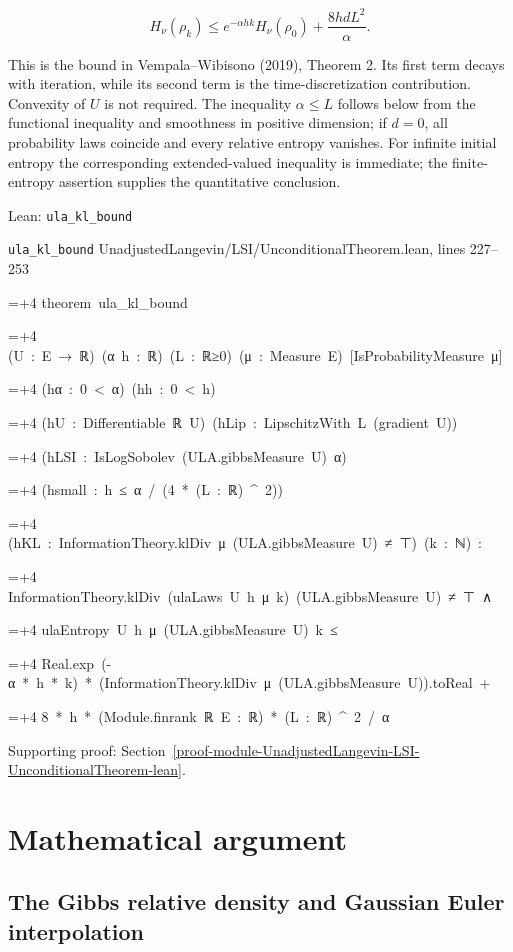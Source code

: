 \documentclass[11pt,a4paper]{report}
\newlength{\leancharwidth}
\newenvironment{leancode}{\par\smallskip\begingroup\ttfamily\footnotesize\raggedright
  \settowidth{\leancharwidth}{M}\setlength{\parskip}{0pt}\setlength{\parindent}{0pt}
  \frenchspacing}{\par\endgroup\smallskip}
\newcommand{\leanline}[2]{\hangindent=\dimexpr#1\leancharwidth+4\leancharwidth\relax
  \hangafter=1\noindent\hspace*{#1\leancharwidth}#2\par}
\newcommand{\leansource}[1]{\par{\footnotesize\color{leanmuted}#1}\par}
\begin{document}
\[\boxed{H_\nu(\rho_k)\le e^{-\alpha hk}H_\nu(\rho_0)+\frac{8hdL^2}{\alpha}.}\]

This is the bound in Vempala–Wibisono (2019), Theorem 2. Its first term decays with iteration, while its second term is the time-discretization contribution. Convexity of \(U\) is not required. The inequality \(\alpha\le L\) follows below from the functional inequality and smoothness in positive dimension; if \(d=0\), all probability laws coincide and every relative entropy vanishes. For infinite initial entropy the corresponding extended-valued inequality is immediate; the finite-entropy assertion supplies the quantitative conclusion.

\begin{leanbox}{Lean: \texttt{ula\_\allowbreak{}kl\_\allowbreak{}bound}}
\leansource{\texttt{ula\_\allowbreak{}kl\_\allowbreak{}bound} \quad UnadjustedLangevin/\allowbreak{}LSI/\allowbreak{}UnconditionalTheorem.lean, lines 227–253}
\begin{leancode}
\leanline{0}{theorem\ ula\_kl\_bound}
\leanline{4}{(U\ :\ E\ →\ ℝ)\ (α\ h\ :\ ℝ)\ (L\ :\ ℝ≥0)\ (μ\ :\ Measure\ E)\ [IsProbabilityMeasure\ μ]}
\leanline{4}{(hα\ :\ 0\ <\ α)\ (hh\ :\ 0\ <\ h)}
\leanline{4}{(hU\ :\ Differentiable\ ℝ\ U)\ (hLip\ :\ LipschitzWith\ L\ (gradient\ U))}
\leanline{4}{(hLSI\ :\ IsLogSobolev\ (ULA.gibbsMeasure\ U)\ α)}
\leanline{4}{(hsmall\ :\ h\ ≤\ α\ /\ (4\ *\ (L\ :\ ℝ)\ \textasciicircum{}\ 2))}
\leanline{4}{(hKL\ :\ InformationTheory.klDiv\ μ\ (ULA.gibbsMeasure\ U)\ ≠\ ⊤)\ (k\ :\ ℕ)\ :}
\leanline{4}{InformationTheory.klDiv\ (ulaLaws\ U\ h\ μ\ k)\ (ULA.gibbsMeasure\ U)\ ≠\ ⊤\ ∧}
\leanline{6}{ulaEntropy\ U\ h\ μ\ (ULA.gibbsMeasure\ U)\ k\ ≤}
\leanline{8}{Real.exp\ (-α\ *\ h\ *\ k)\ *\ (InformationTheory.klDiv\ μ\ (ULA.gibbsMeasure\ U)).toReal\ +}
\leanline{10}{8\ *\ h\ *\ (Module.finrank\ ℝ\ E\ :\ ℝ)\ *\ (L\ :\ ℝ)\ \textasciicircum{}\ 2\ /\ α}
\end{leancode}
\end{leanbox}

{\small\color{gray}Supporting proof: Section~\ref{proof-module-UnadjustedLangevin-LSI-UnconditionalTheorem-lean}.\par}
\chapter{Mathematical argument}
\section{\texorpdfstring{The Gibbs relative density and Gaussian Euler interpolation}{The Gibbs relative density and Gaussian Euler interpolation}}
\end{document}

